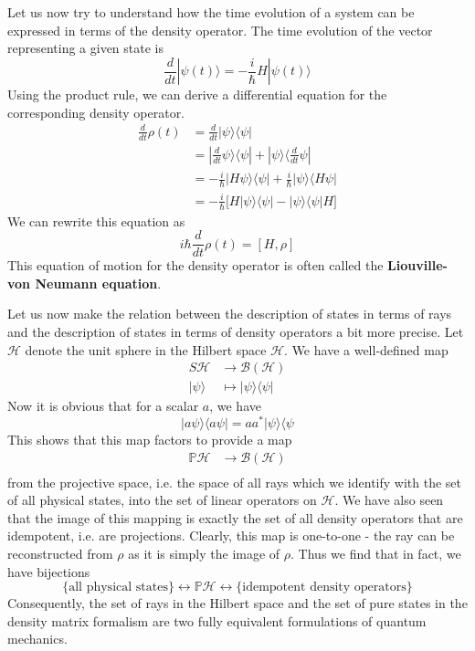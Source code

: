 \documentclass[a4paper, draft]{article}
\theoremstyle{own}
\theoremstyle{remark}
\begin{document}
Let us now try to understand how the time evolution of a system can be expressed in terms of the density operator. The time evolution of the vector representing a given state is 
$$
\frac{d}{dt} |\psi(t) \rangle = - \frac{i}{\hbar} H |\psi(t) \rangle
$$ 
Using the product rule, we can derive a differential equation for the corresponding density operator.
\begin{align*}
\frac{d}{dt} \rho(t) &= \frac{d}{dt} |\psi \rangle \langle \psi |  \\
&= | \frac{d}{dt} \psi \rangle \langle \psi | + |\psi \rangle \langle \frac{d}{dt} \psi | \\
&= - \frac{i}{\hbar} | H \psi \rangle \langle \psi | + \frac{i}{\hbar} |\psi \rangle \langle H \psi |\\
&= - \frac{i}{\hbar} \big[  H | \psi \rangle \langle \psi | -  |\psi \rangle \langle \psi | H \big] 
\end{align*}
We can rewrite this equation as
$$
i \hbar \frac{d}{dt} \rho(t)=  [H, \rho]
$$
This equation of motion for the density operator is often called the {\bf Liouville-von Neumann equation}. 

Let us now make the relation between the description of states in terms of rays and the description of states in terms of density operators a bit more precise. Let ${\mathcal H}$ denote the unit sphere in the Hilbert space $\mathcal H$. We have a well-defined map
\begin{align*}
S{\mathcal H} &\rightarrow  {\mathcal B(\mathcal H)} \\
|\psi \rangle &\mapsto  |\psi \rangle \langle \psi |
\end{align*}
Now it is obvious that for a scalar $a$, we have
$$
|a \psi \rangle \langle a \psi | = a a^* | \psi \rangle \langle  \psi
$$
This shows that this map factors to provide a map
\begin{align*}
{\mathbb P}{\mathcal H} &\rightarrow  {\mathcal B(\mathcal H)} \\
\end{align*}
from the projective space, i.e. the space of all rays which we identify with the set of all physical states, into the set of linear operators on ${\mathcal H}$. We have also seen that the image of this mapping is exactly the set of all density operators that are idempotent, i.e. are projections. Clearly, this map is one-to-one - the ray can be reconstructed from $\rho$ as it is simply the image of $\rho$. Thus we find that in fact, we have bijections
$$
\{ \text{all physical states} \} \leftrightarrow {\mathbb P}{\mathcal H}
\leftrightarrow \{ \text{idempotent density operators} \}
$$
Consequently, the set of rays in the Hilbert space and the set of pure states in the density matrix formalism are two fully equivalent formulations of quantum mechanics. 
\end{document}
